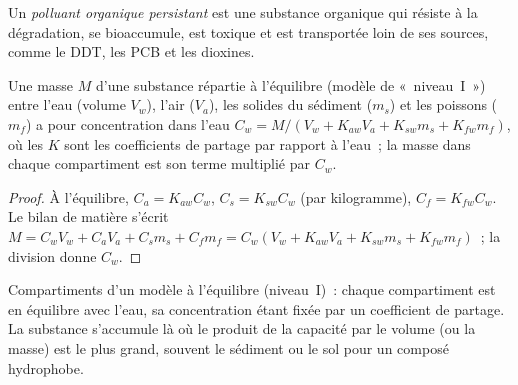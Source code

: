 \begin{definition}\label{def:b3:environmental-toxicology:pop}
Un \emph{polluant organique persistant} est une
substance organique qui résiste à la dégradation, se bioaccumule, est
toxique et est transportée loin de ses sources, comme le DDT, les PCB et
les dioxines.
\end{definition}

\begin{proposition}\label{prop:b3:environmental-toxicology:level-one}
Une masse $M$ d'une substance répartie à l'équilibre (modèle de «~niveau~I~») entre l'eau
(volume $V_w$), l'air ($V_a$), les solides du sédiment ($m_s$) et les poissons ($m_f$) a pour concentration dans l'eau
$C_w = M/(V_w + K_{aw}V_a + K_{sw}m_s + K_{fw}m_f)$, où les $K$ sont les coefficients de partage par rapport à
l'eau~; la masse dans chaque compartiment est son terme multiplié par $C_w$.
\end{proposition}

\begin{proof}
À l'équilibre, $C_a = K_{aw}C_w$, $C_s = K_{sw}C_w$ (par kilogramme), $C_f = K_{fw}C_w$. Le bilan de matière s'écrit
$M = C_wV_w + C_aV_a + C_sm_s + C_fm_f = C_w(V_w + K_{aw}V_a + K_{sw}m_s + K_{fw}m_f)$~; la division donne $C_w$.
\end{proof}

\begin{omfigure}

{\small Compartiments d'un modèle à l'équilibre (niveau~I)~: chaque
compartiment est en équilibre avec l'eau, sa concentration étant fixée par
un coefficient de partage. La substance s'accumule là où le produit de la
capacité par le volume (ou la masse) est le plus grand, souvent le sédiment
ou le sol pour un composé hydrophobe.}
\end{omfigure}

